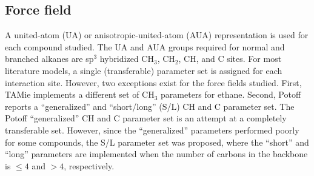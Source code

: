\documentclass[preprint,letterpaper,floatfix,citeautoscript,aip,jcp]{revtex4-1}
\begin{document}

\subsection{Force field} \label{Force Field}

A united-atom (UA) or anisotropic-united-atom (AUA) representation is used for each compound studied. The UA and AUA groups required for normal and branched alkanes are sp$^3$ hybridized CH$_3$, CH$_2$, CH, and C sites. For most literature models, a single (transferable) parameter set is assigned for each interaction site. However, two exceptions exist for the force fields studied. First, TAMie implements a different set of CH$_3$ parameters for ethane. Second, Potoff reports a ``generalized'' and ``short/long'' (S/L) CH and C parameter set. The Potoff ``generalized'' CH and C parameter set is an attempt at a completely transferable set. However, since the ``generalized'' parameters performed poorly for some compounds, the S/L parameter set was proposed, where the ``short'' and ``long'' parameters are implemented when the number of carbons in the backbone is $\le 4$ and $> 4$, respectively. 
\end{document}
